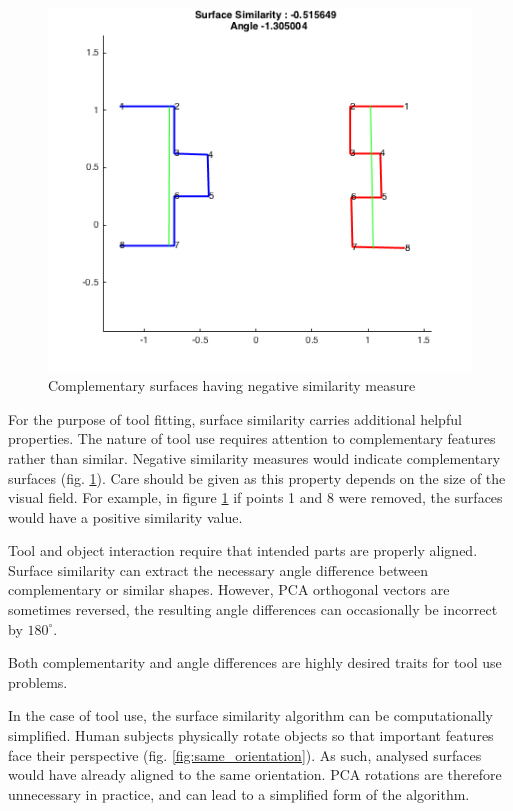 \documentclass[11]{article}
\begin{document}
\begin{figure}[!h]
  \centering
  \includegraphics[width=.6\textwidth]{figures/complementary.png}
  \caption{Complementary surfaces having negative similarity measure}
  \label{fig:complementary}
\end{figure}  

For the purpose of tool fitting, surface similarity carries additional helpful properties. 
The nature of tool use requires attention to complementary features rather than similar. 
Negative similarity measures would indicate complementary surfaces (fig. \ref{fig:complementary}). 
Care should be given as this property depends on the size of the visual field.
For example, in figure \ref{fig:complementary} if points 1 and 8 were removed, the surfaces would have 
a positive similarity value. 

Tool and object interaction require that intended parts are properly aligned.
Surface similarity can extract the necessary angle difference between complementary or similar shapes.
However, PCA orthogonal vectors are sometimes reversed, the resulting angle differences can occasionally be incorrect by $180^{\circ}$. 

Both complementarity and angle differences are highly desired traits for tool use problems.

In the case of tool use, the surface similarity algorithm can be computationally simplified.
Human subjects physically rotate objects so that important features face their perspective (fig. \ref{fig:same_orientation}). 
As such, analysed surfaces would have already aligned to the same orientation.
PCA rotations are therefore unnecessary in practice, and can lead to a simplified form of the algorithm.
\end{document}
